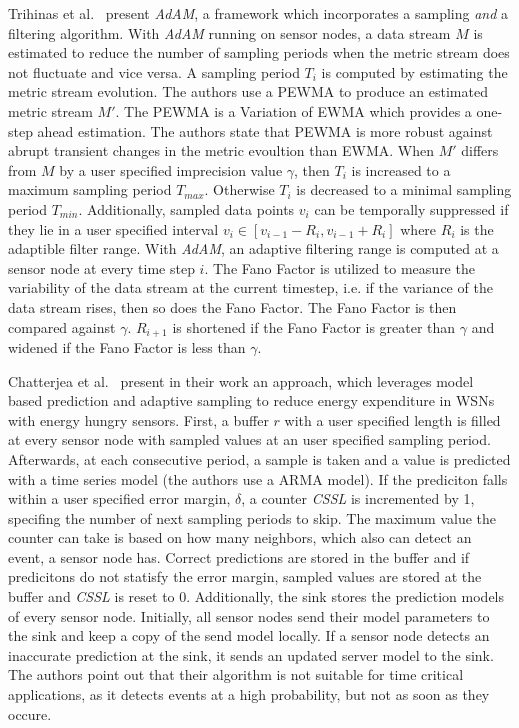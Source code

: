 Trihinas et al.~\cite{trihinas2015adam} present \textit{AdAM}, a framework
which incorporates a sampling \textit{and} a filtering algorithm. With
\textit{AdAM} running on sensor nodes, a data stream $ M $ is estimated to
reduce the number of sampling periods when the metric stream does not fluctuate
and vice versa. A sampling period $ T_i $ is computed by estimating the metric
stream evolution. The authors use a \ac{PEWMA} to produce an estimated metric
stream $ M' $. The \ac{PEWMA} is a Variation of \ac{EWMA} which provides a
one-step ahead estimation. The authors state that \ac{PEWMA} is more robust
against abrupt transient changes in the metric evoultion than \ac{EWMA}. When $
M' $ differs from $ M $ by a user specified imprecision value $
\gamma $, then $ T_i $ is increased to a maximum sampling period $ T_{max}
$. Otherwise $ T_i $ is decreased to a minimal sampling period $ T_{min} $.
Additionally, sampled data points $ v_{i} $ can be temporally suppressed if
they lie in a user specified interval $ v_i \in [v_{i-1} - R_i, v_{i-1} + R_i]
$ where $ R_i $ is the adaptible filter range. With \textit{AdAM}, an adaptive
filtering range is computed at a sensor node at every time step $ i $. The Fano
Factor is utilized to measure the variability of the data stream at the current
timestep, i.e. if the variance of the data stream rises, then so does the Fano
Factor. The Fano Factor is then compared against $ \gamma $. $ R_{i+1} $ is
shortened if the Fano Factor is greater than $ \gamma $ and widened if the Fano
Factor is less than $ \gamma $.

Chatterjea et al.~\cite{chatterjea2008adaptive} present in their work an
approach, which leverages model based prediction and adaptive sampling to
reduce energy expenditure in \acp{WSN} with energy hungry sensors. First, a
buffer $ r $ with a user specified length is filled at every sensor node with
sampled values at an user specified sampling period. Afterwards, at each
consecutive period, a sample is taken and a value is predicted with a time
series model (the authors use a \ac{ARMA} model). If the prediciton falls
within a user specified error margin, $ \delta $, a counter \textit{CSSL} is
incremented by 1, specifing the number of next sampling periods to skip. The
maximum value the counter can take is based on how many neighbors, which also
can detect an event, a sensor node has. Correct predictions are stored in the
buffer and if predicitons do not statisfy the error margin, sampled values are
stored at the buffer and \textit{CSSL} is reset to 0. Additionally, the sink
stores the prediction models of every sensor node. Initially, all sensor nodes
send their model parameters to the sink and keep a copy of the send model
locally. If a sensor node detects an inaccurate prediction at the sink, it
sends an updated server model to the sink. The authors point out that their
algorithm is not suitable for time critical applications, as it detects events
at a high probability, but not as soon as they occure.

